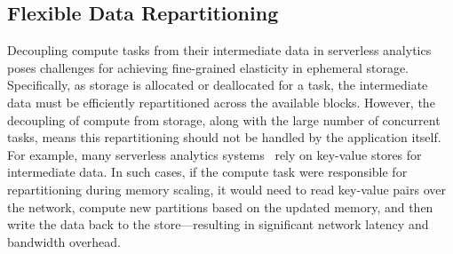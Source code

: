 \subsection{Flexible Data Repartitioning}
\label{ssec:fdr}

Decoupling compute tasks from their intermediate data in serverless analytics poses challenges for achieving fine-grained elasticity in ephemeral storage. Specifically, as storage is allocated or deallocated for a task, the intermediate data must be efficiently repartitioned across the available blocks. However, the decoupling of compute from storage, along with the large number of concurrent tasks, means this repartitioning should not be handled by the application itself. For example, many serverless analytics systems~\cite{locus, pocket} rely on key-value stores for intermediate data. In such cases, if the compute task were responsible for repartitioning during memory scaling, it would need to read key-value pairs over the network, compute new partitions based on the updated memory, and then write the data back to the store—resulting in significant network latency and bandwidth overhead.

 

